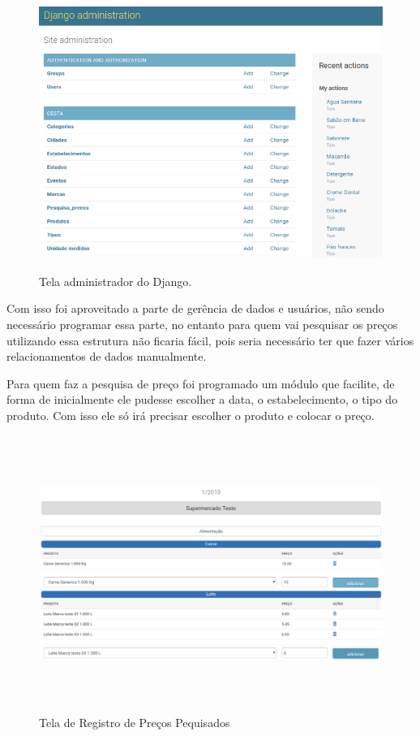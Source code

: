 \documentclass{ifto-tex}
\begin{document}
	\begin{figure}[H]
	\begin{center}
		\includegraphics[width=16.0cm, height= 9.0cm]{cestaadmin.png}    %
		\caption{Tela administrador do Django.} 
		\label{fig:faces}
	\end{center}
\end{figure}
Com isso foi aproveitado a parte de gerência de dados e usuários, não sendo necessário programar essa parte, no entanto para quem vai pesquisar os preços utilizando essa estrutura não ficaria fácil, pois seria necessário ter que fazer vários relacionamentos de dados manualmente.

Para quem faz a pesquisa de preço foi programado um módulo que facilite, de forma de inicialmente ele pudesse escolher a data, o estabelecimento, o tipo do produto. Com isso ele só irá precisar escolher o produto e colocar o preço.

	\begin{figure}[H]
	\begin{center}
		\includegraphics[width=16.0cm, height= 9.0cm]{cestacadastro.png}    %
		\caption{Tela de Registro de Preços Pequisados} 
		\label{fig:faces}
	\end{center}
\end{figure}
\end{document}
